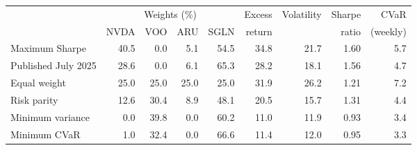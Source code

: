 \begin{tabular}{lrrrrrrrr}
\toprule
 & \multicolumn{4}{c}{Weights (\%)} & Excess & Volatility & Sharpe & CVaR \\
\cmidrule(lr){2-5}
 & NVDA & VOO & ARU & SGLN & return & & ratio & (weekly) \\
\midrule
Maximum Sharpe & 40.5 & 0.0 & 5.1 & 54.5 & 34.8 & 21.7 & 1.60 & 5.7 \\
Published July 2025 & 28.6 & 0.0 & 6.1 & 65.3 & 28.2 & 18.1 & 1.56 & 4.7 \\
Equal weight & 25.0 & 25.0 & 25.0 & 25.0 & 31.9 & 26.2 & 1.21 & 7.2 \\
Risk parity & 12.6 & 30.4 & 8.9 & 48.1 & 20.5 & 15.7 & 1.31 & 4.4 \\
Minimum variance & 0.0 & 39.8 & 0.0 & 60.2 & 11.0 & 11.9 & 0.93 & 3.4 \\
Minimum CVaR & 1.0 & 32.4 & 0.0 & 66.6 & 11.4 & 12.0 & 0.95 & 3.3 \\
\bottomrule
\end{tabular}
